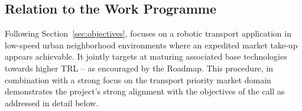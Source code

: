 
\subsection{Relation to the Work Programme}
\label{sec:relevance}



Following Section~\ref{sec:objectives}, \Project{} focuses on a robotic transport application in low-speed urban neighborhood environments where an expedited market take-up appears achievable. It jointly targets at maturing associated base technologies towards higher TRL -- as encouraged by the Roadmap. This procedure, in combination with a strong focus on the transport priority market domain demonstrates the project's strong alignment with the objectives of the call as addressed in detail below.

